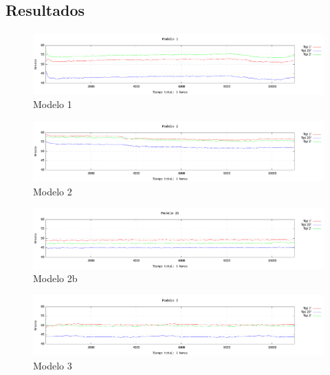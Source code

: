 \subsection{Resultados}
\paragraph{}

\begin{figure}[H]
	\centering
  	\includegraphics[width=160mm]{Test/pr2_modelo1.pdf}
   	\caption[Prueba 2, Modelo 1]{Modelo 1}
   \label{figure5.5}
\end{figure}

\begin{figure}[H]
	\centering
  	\includegraphics[width=160mm]{Test/pr2_modelo2.pdf}
   	\caption[Prueba 2, Modelo 2]{Modelo 2}
   \label{figure5.6}
\end{figure}

\begin{figure}[H]
	\centering
  	\includegraphics[width=160mm]{Test/pr2_modelo2b.pdf}
   	\caption[Prueba 2, Modelo 2b]{Modelo 2b}
   \label{figure5.7}
\end{figure}

\begin{figure}[H]
	\centering
  	\includegraphics[width=160mm]{Test/pr2_modelo3.pdf}
   	\caption[Prueba 2, Modelo 3]{Modelo 3}
   \label{figure5.8}
\end{figure}

